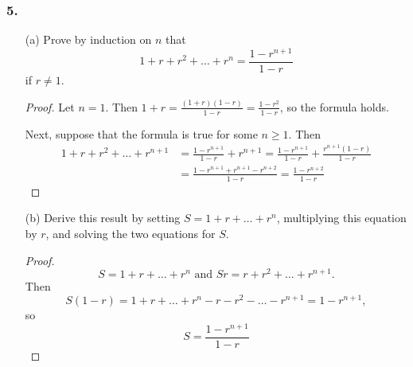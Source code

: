 \documentclass{article}
\begin{document}
\subsubsection*{5.}
\begin{enumerate}
	\item[(a)] Prove by induction on $n$ that \[ 1 + r + r^2 + \dots + r^n = \frac{1 - r^{n+1}}{1 - r} \] if $r \ne 1$.
	\begin{proof}
		Let $n = 1$. Then $1 + r = \frac{(1 + r)(1 - r)}{1 - r} = \frac{1 - r^2}{1 - r}$, so the formula holds.

		Next, suppose that the formula is true for some $n \ge 1$. Then
		\begin{align*}
			1 + r + r^2 + \dots + r^{n+1} &= \frac{1 - r^{n+1}}{1-r} + r^{n+1} = \frac{1 - r^{n+1}}{1-r} + \frac{r^{n+1}(1 - r)}{1 - r} \\&= \frac{1 - r^{n+1} + r^{n+1} - r^{n+2}}{1 - r} = \frac{1 - r^{n + 2}}{1 - r}
		\end{align*}
	\end{proof}
	\item[(b)] Derive this result by setting $S = 1 + r + \dots + r^n$, multiplying this equation by $r$, and solving the two equations for $S$.
	\begin{proof}
		\[ S = 1 + r + \dots + r^n \text{ and } Sr = r + r^2 + \dots + r^{n+1}. \] Then \[ S(1 - r) = 1 + r + \dots + r^n - r - r^2 - \dots - r^{n+1} = 1 - r^{n+1}, \] so \[ S = \frac{1 - r^{n+1}}{1 - r} \]
	\end{proof}
\end{enumerate} 
\end{document}
